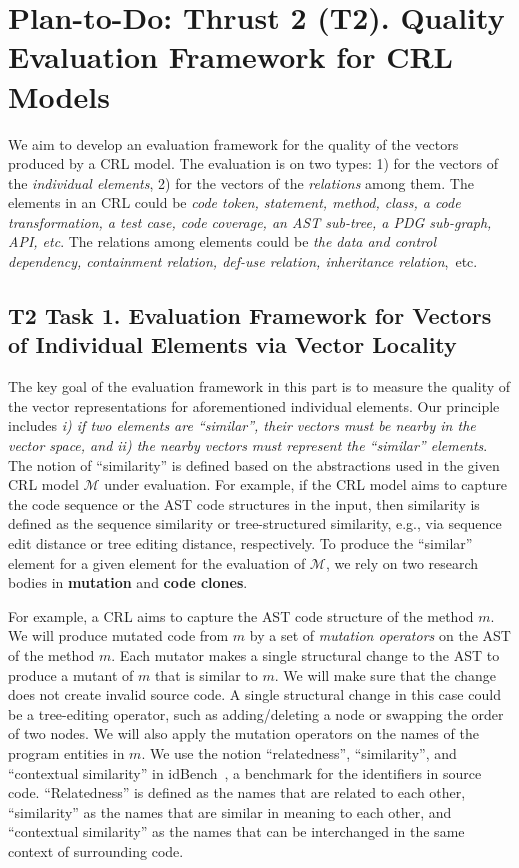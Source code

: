 \section{Plan-to-Do: Thrust 2 (T2). Quality Evaluation Framework for CRL Models}
\label{thrust:eval}

We aim to develop an evaluation framework for the quality of the
vectors produced by a CRL model. The evaluation is on two types: 1)
for the vectors of the {\em individual elements}, 2) for the vectors
of the {\em relations} among them. The elements in an CRL could be
{\em code token, statement, method, class, a code transformation, a
  test case, code coverage, an AST sub-tree, a PDG sub-graph, API,
  etc}. The relations among elements could be {\em the data and control
dependency, containment relation, def-use relation, inheritance
relation},~etc.

\subsection{T2 Task 1. Evaluation Framework for Vectors of Individual Elements via Vector Locality}

The key goal of the evaluation framework in this part is to measure
the quality of the vector representations for aforementioned
individual elements. Our principle includes {\em i) if two elements
  are ``similar'', their vectors must be nearby in the vector space,
  and ii) the nearby vectors must represent the ``similar'' elements}.
The notion of ``similarity'' is defined based on the abstractions used
in the given CRL model $\mathcal{M}$ under evaluation. For example, if
the CRL model aims to capture the code sequence or the AST code
structures in the input, then similarity is defined as the sequence
similarity or tree-structured similarity, e.g., via sequence edit
distance or tree editing distance, respectively. To produce the
``similar'' element for a given element for the evaluation of
$\mathcal{M}$, we rely on two research bodies in {\bf mutation} and
{\bf code clones}.

For example, a CRL aims to capture the AST code structure of the
method $m$. We will produce mutated code from $m$ by a set of {\em
  mutation operators} on the AST of the method $m$. Each mutator makes
a single structural change to the AST to produce a mutant of $m$ that
is similar to $m$.  We will make sure that the change does not create
invalid source code. A single structural change in this case could be
a tree-editing operator, such as adding/deleting a node or swapping
the order of two nodes. We will also apply the mutation operators on
the names of the program entities in $m$. We use the notion
``relatedness'', ``similarity'', and ``contextual similarity'' in
idBench~\cite{idbench}, a benchmark for the identifiers in source
code. ``Relatedness'' is defined as the names that are related to each
other, ``similarity'' as the names that are similar in meaning to each
other, and ``contextual similarity'' as the names that can be
interchanged in the same context of surrounding code.

